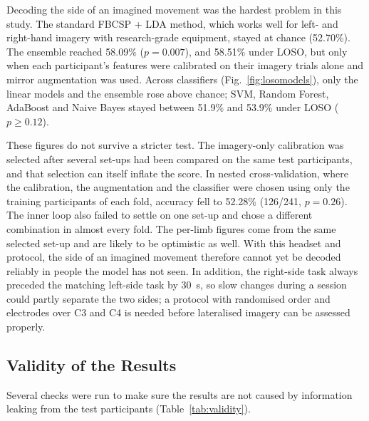 \documentclass[pdflatex,sn-mathphys-num]{sn-jnl}%
\theoremstyle{thmstyleone}%
\theoremstyle{thmstyletwo}%
\theoremstyle{thmstylethree}%
\begin{document}
Decoding the side of an imagined movement was the hardest problem in this study. The standard FBCSP + LDA method, which works well for left- and right-hand imagery with research-grade equipment, stayed at chance (52.70\%). The ensemble reached 58.09\% ($p = 0.007$), and 58.51\% under LOSO, but only when each participant's features were calibrated on their imagery trials alone and mirror augmentation was used. Across classifiers (Fig.~\ref{fig:losomodels}), only the linear models and the ensemble rose above chance; SVM, Random Forest, AdaBoost and Naive Bayes stayed between 51.9\% and 53.9\% under LOSO ($p \ge 0.12$).

These figures do not survive a stricter test. The imagery-only calibration was selected after several set-ups had been compared on the same test participants, and that selection can itself inflate the score. In nested cross-validation, where the calibration, the augmentation and the classifier were chosen using only the training participants of each fold, accuracy fell to 52.28\% (126/241, $p = 0.26$). The inner loop also failed to settle on one set-up and chose a different combination in almost every fold. The per-limb figures come from the same selected set-up and are likely to be optimistic as well. With this headset and protocol, the side of an imagined movement therefore cannot yet be decoded reliably in people the model has not seen. In addition, the right-side task always preceded the matching left-side task by 30~s, so slow changes during a session could partly separate the two sides; a protocol with randomised order and electrodes over C3 and C4 is needed before lateralised imagery can be assessed properly.

\subsection{Validity of the Results}\label{subsec:validity}

Several checks were run to make sure the results are not caused by information leaking from the test participants (Table~\ref{tab:validity}).
\end{document}
